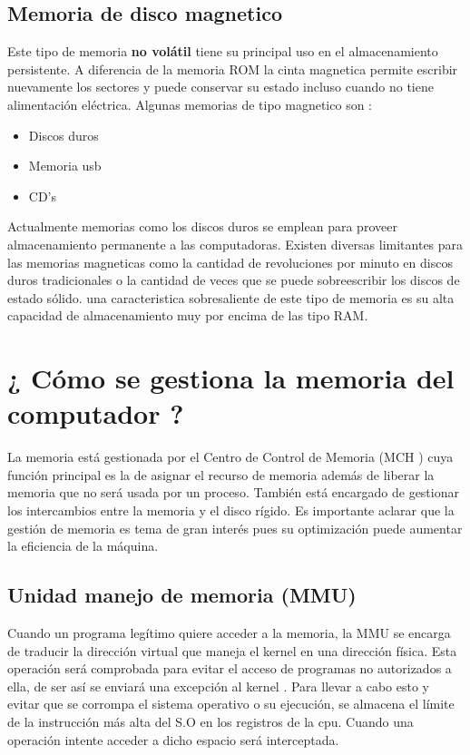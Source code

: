 \documentclass{article}
\begin{document}
\subsection{Memoria de disco magnetico}
Este tipo de memoria \textbf{no volátil} tiene su principal uso en el almacenamiento persistente. A diferencia de la memoria ROM la cinta magnetica permite escribir nuevamente los sectores y puede conservar su estado incluso cuando no tiene alimentación eléctrica. Algunas memorias de tipo magnetico son :

\begin{itemize}
    \item {Discos duros }
    \item {Memoria usb}
    \item {CD's}
\end{itemize}

Actualmente memorias como los discos duros se emplean para proveer almacenamiento permanente a las computadoras. Existen diversas limitantes para las memorias magneticas como la cantidad de revoluciones por minuto en discos duros tradicionales o la cantidad de veces que se puede sobreescribir los discos de estado sólido.
una caracteristica sobresaliente de este tipo de memoria es su alta capacidad de almacenamiento muy por encima de las tipo RAM.

\section{¿ Cómo se gestiona la memoria del computador ?}

La memoria está gestionada por el Centro de Control de Memoria (MCH
) cuya función principal es la de asignar el recurso de memoria además 
de liberar la memoria que no será usada por un proceso. También está encargado de gestionar los intercambios entre la memoria y el disco rígido.
Es importante aclarar que la gestión de memoria es tema de gran interés pues su optimización puede aumentar la eficiencia de la máquina.

\subsection{Unidad manejo de memoria (MMU)}
Cuando un programa legítimo quiere acceder a la memoria, la MMU
 se encarga de traducir la dirección virtual que maneja el kernel
 en una dirección física. Esta operación será comprobada para evitar el acceso de programas no autorizados a ella, de ser así se enviará una excepción al kernel
. Para llevar a cabo esto y evitar que se corrompa el sistema operativo o su ejecución, se almacena el límite de la instrucción más alta del S.O en los registros de la cpu. Cuando una operación intente acceder a dicho espacio será interceptada.
\end{document}
